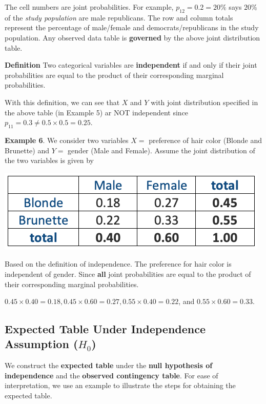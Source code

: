 \documentclass[
]{article}
\begin{document}
The cell numbers are joint probabilities. For example,
\(p_{12} = 0.2 = 20\%\) says \(20\%\) of the \emph{study population} are
male republicans. The row and column totals represent the percentage of
male/female and democrats/republicans in the study population. Any
observed data table is \textbf{governed} by the above joint distribution
table.

\textbf{Definition} Two categorical variables are \textbf{independent}
if and only if their joint probabilities are equal to the product of
their corresponding marginal probabilities.

With this definition, we can see that \(X\) and \(Y\) with joint
distribution specified in the above table (in Example 5) ar NOT
independent since \(p_{11} =0.3 \ne 0.5\times 0.5 = 0.25\).

\textbf{Example 6}. We consider two variables \(X =\) preference of hair
color (Blonde and Brunette) and \(Y =\) gender (Male and Female). Assume
the joint distribution of the two variables is given by

\begin{center}\includegraphics[width=0.35\linewidth]{week13/independenceContingencyTable} \end{center}

Based on the definition of independence. The preference for hair color
is independent of gender. Since \textbf{all} joint probabilities are
equal to the product of their corresponding marginal probabilities.

\(0.45\times 0.40 = 0.18, 0.45 \times 0.60 = 0.27, 0.55 \times 0.40 = 0.22\),
and \(0.55 \times 0.60 = 0.33.\)

\hypertarget{expected-table-under-independence-assumption-h_0}{%
\subsection{\texorpdfstring{Expected Table Under Independence Assumption
(\textbf{\(H_0\)})}{Expected Table Under Independence Assumption (H\_0)}}\label{expected-table-under-independence-assumption-h_0}}

We construct the \textbf{expected table} under the \textbf{null
hypothesis of independence} and the \textbf{observed contingency table}.
For ease of interpretation, we use an example to illustrate the steps
for obtaining the expected table.
\end{document}
